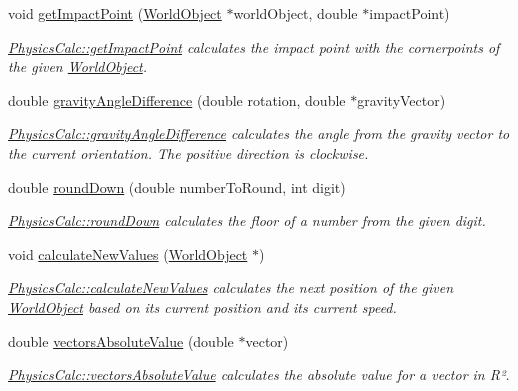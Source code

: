 \begin{DoxyCompactItemize}
\item 
void \hyperlink{class_physics_calc_a9bbfe3998836451d84697577c0e6195d}{get\+Impact\+Point} (\hyperlink{class_world_object}{World\+Object} $\ast$world\+Object, double $\ast$impact\+Point)
\begin{DoxyCompactList}\small\item\em \hyperlink{class_physics_calc_a9bbfe3998836451d84697577c0e6195d}{Physics\+Calc\+::get\+Impact\+Point} calculates the impact point with the cornerpoints of the given \hyperlink{class_world_object}{World\+Object}. \end{DoxyCompactList}\item 
double \hyperlink{class_physics_calc_a515dcab8395108cb37b7526adbab6ed0}{gravity\+Angle\+Difference} (double rotation, double $\ast$gravity\+Vector)
\begin{DoxyCompactList}\small\item\em \hyperlink{class_physics_calc_a515dcab8395108cb37b7526adbab6ed0}{Physics\+Calc\+::gravity\+Angle\+Difference} calculates the angle from the gravity vector to the current orientation. The positive direction is clockwise. \end{DoxyCompactList}\item 
double \hyperlink{class_physics_calc_a7e24e0769598a509705a71a0c4e8ab5d}{round\+Down} (double number\+To\+Round, int digit)
\begin{DoxyCompactList}\small\item\em \hyperlink{class_physics_calc_a7e24e0769598a509705a71a0c4e8ab5d}{Physics\+Calc\+::round\+Down} calculates the floor of a number from the given digit. \end{DoxyCompactList}\item 
void \hyperlink{class_physics_calc_a8d6de304c47a3b6be6fdfd7bacd3dcd2}{calculate\+New\+Values} (\hyperlink{class_world_object}{World\+Object} $\ast$)
\begin{DoxyCompactList}\small\item\em \hyperlink{class_physics_calc_a8d6de304c47a3b6be6fdfd7bacd3dcd2}{Physics\+Calc\+::calculate\+New\+Values} calculates the next position of the given \hyperlink{class_world_object}{World\+Object} based on it\textquotesingle{}s current position and its current speed. \end{DoxyCompactList}\item 
double \hyperlink{class_physics_calc_a5915904f1743c3a6cca6cf2b72a8d6f5}{vectors\+Absolute\+Value} (double $\ast$vector)
\begin{DoxyCompactList}\small\item\em \hyperlink{class_physics_calc_a5915904f1743c3a6cca6cf2b72a8d6f5}{Physics\+Calc\+::vectors\+Absolute\+Value} calculates the absolute value for a vector in R². \end{DoxyCompactList}\item 

\end{DoxyCompactItemize}
